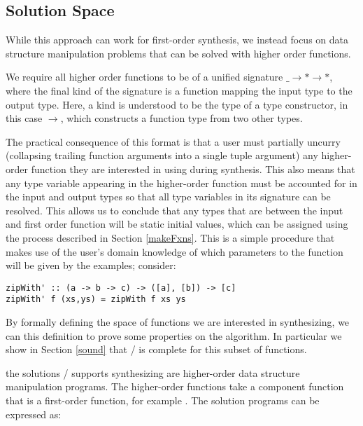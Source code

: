%

\subsection{Solution Space}\label{solnSpace}
While this approach can work for first-order synthesis, we instead focus on data structure manipulation problems that can be solved with higher order functions.

We require all higher order functions to be of a unified signature \texttt{$\_ \to * \to *$}, where the final kind of the signature is a function mapping the input type to the output type. 
Here, a kind is understood to be the type of a type constructor, in this case \texttt{$\to$}, which constructs a function type from two other types.

The practical consequence of this format is that a user must partially uncurry (collapsing trailing function arguments into a single tuple argument) any higher-order function they are interested in using during synthesis.
This also means that any type variable appearing in the higher-order function must be accounted for in the input and output types so that all type variables in its signature can be resolved.
This allows us to conclude that any types that are between the input and first order function will be static initial values, which can be assigned using the process described in Section \ref{makeFxns}.
This is a simple procedure that makes use of the user's domain knowledge of which parameters to the function will be given by the examples; consider:

\begin{lstlisting}
zipWith' :: (a -> b -> c) -> ([a], [b]) -> [c]
zipWith' f (xs,ys) = zipWith f xs ys
\end{lstlisting}

By formally defining the space of functions we are interested in synthesizing, we can this definition to prove some properties on the algorithm.
In particular we show in Section \ref{sound} that \ourTool/ is complete for this subset of functions.

the solutions \ourTool/ supports synthesizing are higher-order data structure manipulation programs.
The higher-order functions take a component function that is a first-order function, for example \codeinline{(+)}.
The solution programs can be expressed as:

